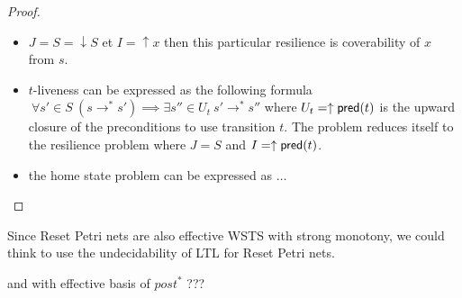 \begin{proof}

\begin{itemize}
\item $J=S= \downarrow S$ et $I=\uparrow x$ then this particular resilience is coverability of $x$ from $s$.

\item $t$-liveness  can be expressed as the following formula
$ ~ \forall s' \in S ~ (s \rightarrow^* s') \implies \exists s'' \in U_t ~ s' \rightarrow^{*} s''$ 
where
$U_t=\uparrow \textsf{pred}(t)$
is the upward closure of the preconditions to use transition $t$.  
The problem reduces itself to the resilience problem
where $J=S$ and $I = \uparrow \textsf{pred}(t)$.

\item the home state problem can be expressed as $\ldots$
\end{itemize}

\end{proof}

Since Reset Petri nets are also effective WSTS with strong monotony, we could think to use the undecidability of LTL for Reset Petri nets.

and with effective basis of $post^*$ ???







